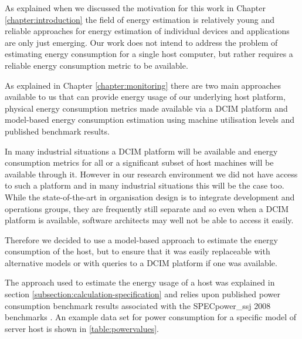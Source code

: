 As explained when we discussed the motivation for this work in Chapter \ref{chapter:introduction} the field of energy estimation is relatively young and reliable approaches for energy estimation of individual devices and applications are only just emerging.  Our work does not intend to address the problem of estimating energy consumption for a single host computer, but rather requires a reliable energy consumption metric to be available.

As explained in Chapter \ref{chapter:monitoring} there are two main approaches available to us that can provide energy usage of our underlying host platform, physical energy consumption metrics made available via a DCIM platform and model-based energy consumption estimation using machine utilisation levels and published benchmark results.

In many industrial situations a DCIM platform will be available and energy consumption metrics for all or a significant subset of host machines will be available through it.  However in our research environment we did not have access to such a platform and in many industrial situations this will be the case too.  While the state-of-the-art in organisation design is to integrate development and operations groups, they are frequently still separate and so even when a DCIM platform is available, software architects may well not be able to access it easily.

Therefore we decided to use a model-based approach to estimate the energy consumption of the host, but to ensure that it was easily replaceable with alternative models or with queries to a DCIM platform if one was available.

The approach used to estimate the energy usage of a host was explained in section \ref{subsection:calculation-specification} and relies upon published power consumption benchmark results associated with the SPECpower\_ssj 2008 benchmarks \cite{lange2009-specpower}.  An example data set for power consumption for a specific model of server host is shown in \ref{table:powervalues}.

